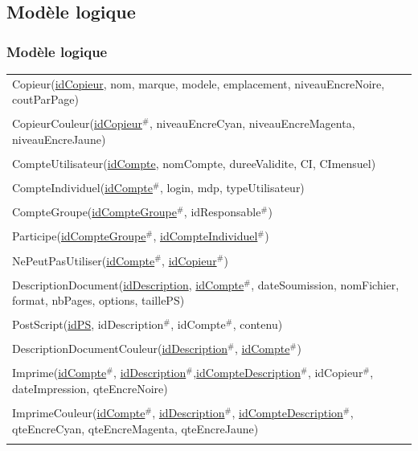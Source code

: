 \documentclass{beamer}
\begin{document}
\subsection{Modèle logique}

\begin{frame}
  \frametitle{Modèle logique}
\tiny
 \begin{tabular}{p{\textwidth}}
            Copieur(\underline{idCopieur}, nom, marque, modele, emplacement, niveauEncreNoire, coutParPage)\\
            \\
            CopieurCouleur(\underline{idCopieur}$^{\#}$, niveauEncreCyan, niveauEncreMagenta, niveauEncreJaune)\\
            \\
            CompteUtilisateur(\underline{idCompte}, nomCompte, dureeValidite, CI, CImensuel)\\
            \\
            CompteIndividuel(\underline{idCompte}$^{\#}$, login, mdp, typeUtilisateur)\\
            \\
            CompteGroupe(\underline{idCompteGroupe}$^{\#}$, idResponsable$^{\#}$)\\
            \\
            Participe(\underline{idCompteGroupe}$^{\#}$, \underline{idCompteIndividuel}$^{\#}$)\\
            \\
            NePeutPasUtiliser(\underline{idCompte}$^{\#}$, \underline{idCopieur}$^{\#}$)\\
            \\
            DescriptionDocument(\underline{idDescription}, \underline{idCompte}$^{\#}$, dateSoumission, nomFichier, 
            format, nbPages, options, taillePS)\\
            \\
            PostScript(\underline{idPS}, idDescription$^{\#}$, idCompte$^{\#}$, contenu)\\
            \\
            DescriptionDocumentCouleur(\underline{idDescription}$^{\#}$, \underline{idCompte}$^{\#}$)\\
            \\
            Imprime(\underline{idCompte}$^{\#}$, \underline{idDescription}$^{\#}$,\underline{idCompteDescription}$^{\#}$, 
            idCopieur$^{\#}$, dateImpression, qteEncreNoire)\\
            \\
            ImprimeCouleur(\underline{idCompte}$^{\#}$, \underline{idDescription}$^{\#}$, \underline{idCompteDescription}$^{\#}$, 
             qteEncreCyan, qteEncreMagenta, qteEncreJaune)\\
            \\
            
          \end{tabular}

\end{frame}
\end{document}
